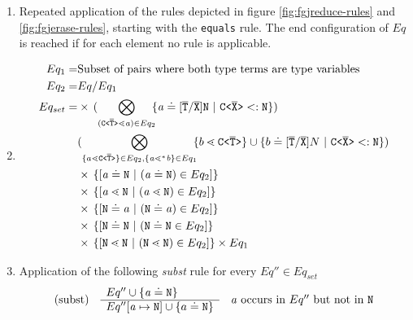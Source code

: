 \begin{enumerate}
\item Repeated application of the rules depicted in figure \ref{fig:fgjreduce-rules} and \ref{fig:fgjerase-rules},
starting with the \texttt{equals} rule.
The end configuration of $Eq$ is reached if for each element no rule is applicable.
\item
\begin{align*}
Eq_1 =& \text{Subset of pairs where both type terms are type variables}\\
Eq_2 =& Eq / Eq_1 \\
Eq_{set}
    = 
    & \times\, 
    (\displaystyle{\bigotimes_{(\exptype{C}{\overline{T}} \lessdot   \tv{a}) \in Eq_2}}\!\!
    \set{\tv{a} \doteq [\ol{T}/\ol{X}]\type{N} \ | \ \exptype{C}{\overline{X}} <: \type{N} })\\
    & (\displaystyle{\bigotimes_{\set{a \lessdot \exptype{C}{\overline{T}}} \in Eq_2, \set{ \tv{a} \lessdot^* \tv{b}} \in Eq_1}}\!\!
    \set{ b \lessdot \exptype{C}{\ol{T}}} \cup \set{b \doteq [\ol{T}/\ol{X}]N \ | \ \exptype{C}{\overline{X}} <: \type{N} })\\
    & \times\, \set{[\tv{a} \doteq \type{N} \ | \  (\tv{a} \doteq \type{N}) \in Eq_2]} \\
    & \times\, \set{[\tv{a} \lessdot \type{N} \ | \  (\tv{a} \lessdot \type{N}) \in Eq_2]}  \\
    & \times\, \set{[\type{N} \doteq \tv{a} \ | \  (\type{N} \doteq \tv{a}) \in Eq_2]}  \\
    & \times\, \set{[\type{N} \doteq \type{N} \ | \  (\type{N} \doteq \type{N} \in Eq_2]} \\
    & \times\, \set{[\type{N} \lessdot \type{N} \ | \  (\type{N} \lessdot \type{N}) \in Eq_2]} \times Eq_1 \\
\end{align*}
\item \label{subst-step}  Application of the following \emph{subst} rule for every $Eq'' \in Eq_{set}$
      $$\begin{array}[c]{lll}
        (\mathrm{subst}) &
        \begin{array}[c]{l}
          Eq'' \cup \{ \mathit{ a } \doteq \texttt{N} \}\\
          \hline
          Eq''[\mathit{ a } \mapsto \texttt{N}] \cup \{ a \doteq \texttt{N} \}
        \end{array}
        & \mathit{ a } \textrm{ occurs in } Eq'' \textrm{ but not in } \texttt{N}
      \end{array}$$
      

\end{enumerate}
